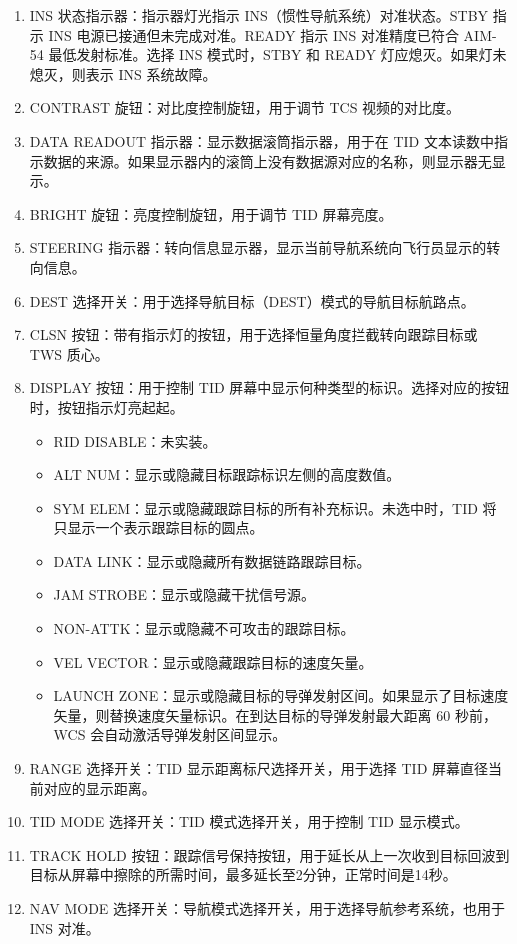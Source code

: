 \begin{enumerate}
	\item INS 状态指示器：指示器灯光指示 INS（惯性导航系统）对准状态。STBY 指示 INS 电源已接通但未完成对准。READY 指示 INS 对准精度已符合 AIM-54 最低发射标准。选择 INS 模式时，STBY 和 READY 灯应熄灭。如果灯未熄灭，则表示 INS 系统故障。
	\item CONTRAST 旋钮：对比度控制旋钮，用于调节 TCS 视频的对比度。
	\item DATA READOUT 指示器：显示数据滚筒指示器，用于在 TID 文本读数中指示数据的来源。如果显示器内的滚筒上没有数据源对应的名称，则显示器无显示。
	\item BRIGHT 旋钮：亮度控制旋钮，用于调节 TID 屏幕亮度。
	\item STEERING 指示器：转向信息显示器，显示当前导航系统向飞行员显示的转向信息。
	\item DEST 选择开关：用于选择导航目标（DEST）模式的导航目标航路点。
	\item CLSN 按钮：带有指示灯的按钮，用于选择恒量角度拦截转向跟踪目标或 TWS 质心。
	\item DISPLAY 按钮：用于控制 TID 屏幕中显示何种类型的标识。选择对应的按钮时，按钮指示灯亮起起。
	      \begin{itemize}
		      \item RID DISABLE：未实装。
		      \item ALT NUM：显示或隐藏目标跟踪标识左侧的高度数值。
		      \item SYM ELEM：显示或隐藏跟踪目标的所有补充标识。未选中时，TID 将只显示一个表示跟踪目标的圆点。
		      \item DATA LINK：显示或隐藏所有数据链路跟踪目标。
		      \item JAM STROBE：显示或隐藏干扰信号源。
		      \item NON-ATTK：显示或隐藏不可攻击的跟踪目标。
		      \item VEL VECTOR：显示或隐藏跟踪目标的速度矢量。
		      \item LAUNCH ZONE：显示或隐藏目标的导弹发射区间。如果显示了目标速度矢量，则替换速度矢量标识。在到达目标的导弹发射最大距离 60 秒前，WCS 会自动激活导弹发射区间显示。
	      \end{itemize}
	\item RANGE 选择开关：TID 显示距离标尺选择开关，用于选择 TID 屏幕直径当前对应的显示距离。
	\item TID MODE 选择开关：TID 模式选择开关，用于控制 TID 显示模式。
	\item TRACK HOLD 按钮：跟踪信号保持按钮，用于延长从上一次收到目标回波到目标从屏幕中擦除的所需时间，最多延长至2分钟，正常时间是14秒。
	\item NAV MODE 选择开关：导航模式选择开关，用于选择导航参考系统，也用于 INS 对准。
\end{enumerate}


